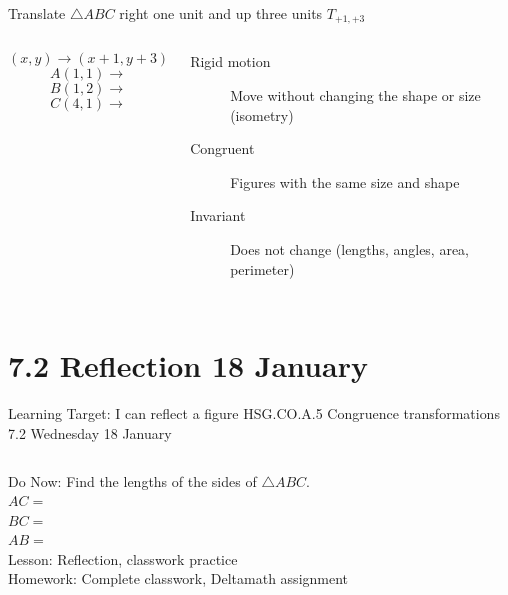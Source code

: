 \begin{frame}{Translate $\triangle ABC$ right one unit and up three units $T_{+1,+3}$}
    \begin{columns}
        $$(x,y) \rightarrow (x+1,y+3)$$
        $$A(1,1) \rightarrow$$
        $$B(1,2) \rightarrow$$
        $$C(4,1) \rightarrow$$

        \begin{description}
            \item[Rigid motion] Move without changing the shape or size (isometry)
            \item[Congruent] Figures with the same size and shape
            \item[Invariant] Does not change (lengths, angles, area, perimeter)
          \end{description}
    \begin{flushright}
    \end{flushright}
\end{columns}
\end{frame}

\section{7.2 Reflection \hfill 18 January \,}
\begin{frame}{Learning Target: I can reflect a figure}
  {HSG.CO.A.5 Congruence transformations \hfill \alert{7.2 Wednesday 18 January}}
  \begin{columns}
    Do Now: Find the lengths of the sides of $\triangle ABC$. \\
    $AC=$ \\
    $BC=$ \\
    $AB=$ \\[0.5cm]
    Lesson: Reflection, classwork practice \\
    Homework: Complete classwork, Deltamath assignment
    \begin{flushright}
    \end{flushright}
  \end{columns}
\end{frame}

